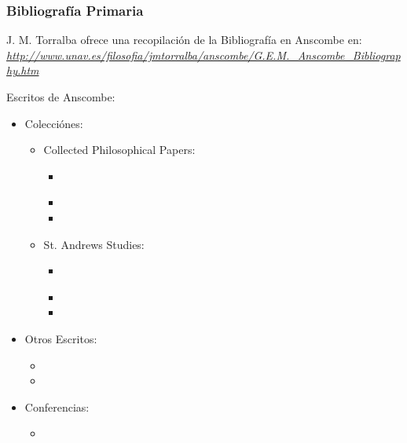 \subsubsection{Bibliografía Primaria}
\noindent J. M. Torralba ofrece una recopilación de la Bibliografía en Anscombe en:\\
\emph{\href{http://www.unav.es/filosofia/jmtorralba/anscombe/G.E.M.\_Anscombe\_Bibliography.htm}{http://www.unav.es/filosofia/jmtorralba/anscombe/G.E.M.\_Anscombe\_Bibliography.htm}}

\noindent Escritos de Anscombe:




\printbibliography[keyword={anscombe}]

\begin{itemize}
    \item Colecciónes:
      \begin{itemize}
          \item Collected Philosophical Papers:
            \begin{itemize}
                \item \cite{collectedppI}
                \item {}
                \item {}
            \end{itemize}

          \item St. Andrews Studies:
            \begin{itemize}
                \item \cite{hlae}
                \item {}
                \item {}
            \end{itemize}
      \end{itemize}
    \item Otros Escritos:
      \begin{itemize}
        \item {}
        \item {}
      \end{itemize}
    \item Conferencias:
      \begin{itemize}
        \item {}
      \end{itemize}

\end{itemize}

